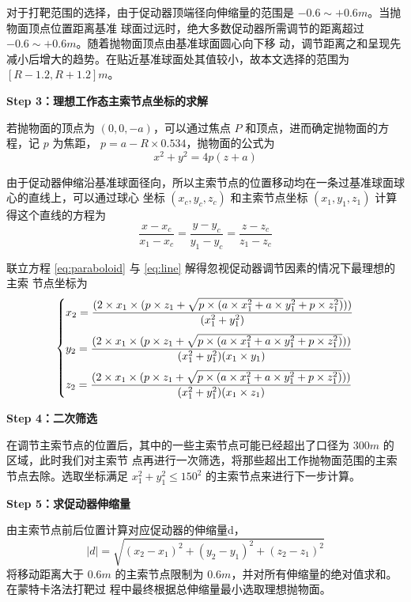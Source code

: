 \documentclass[withoutpreface,bwprint]{cumcmthesis} %
\begin{document}
对于打靶范围的选择，由于促动器顶端径向伸缩量的范围是 $-0.6\sim +0.6m$。当抛物面顶点位置距离基准
球面过远时，绝大多数促动器所需调节的距离超过 $-0.6\sim +0.6m$。随着抛物面顶点由基准球面圆心向下移
动，调节距离之和呈现先减小后增大的趋势。在贴近基准球面处其值较小，故本文选择的范围为$\left[R-1.2,
R+1.2\right]m$。

\textbf{Step 3：理想工作态主索节点坐标的求解}

若抛物面的顶点为 $(0,0,-a)$，可以通过焦点 $P$ 和顶点，进而确定抛物面的方程，记 $p$ 为焦距，
$p = a-R \times 0.534$，抛物面的公式为
\begin{equation}
    \label{eq:paraboloid}
    x^2 + y^2 = 4p(z + a)
\end{equation}

由于促动器伸缩沿基准球面径向，所以主索节点的位置移动均在一条过基准球面球心的直线上，可以通过球心
坐标 $(x_c,y_c,z_c)$ 和主索节点坐标 $(x_1,y_1,z_1)$ 计算得这个直线的方程为
\begin{equation}
    \label{eq:line}
    \frac{\displaystyle x - x_c}{\displaystyle x_1 - x_c} = \frac{\displaystyle y - y_c}
    {\displaystyle y_1 - y_c} = \frac{\displaystyle z - z_c}{\displaystyle z_1 - z_c}
\end{equation}

联立方程 \eqref{eq:paraboloid} 与 \eqref{eq:line} 解得忽视促动器调节因素的情况下最理想的主索
节点坐标为
\[
\begin{dcases}
    \smallskip
    x_2 = \frac{(2\times x_1\times (p\times z_1 + \sqrt{p\times (a\times x_1^2 + a\times
    y_1^2 + p\times z_1^2)}))}{(x_1^2 + y_1^2)}  \\
    \smallskip
    y_2 = \frac{(2\times x_1\times (p\times z_1 + \sqrt{p\times (a\times x_1^2 + a\times
    y_1^2 + p\times z_1^2)}))}{(x_1^2 + y_1^2)(x_1 \times y_1)}  \\
    z_2 = \frac{(2\times x_1\times (p\times z_1 + \sqrt{p\times (a\times x_1^2 + a\times
    y_1^2 + p\times z_1^2)}))}{(x_1^2 + y_1^2)(x_1 \times z_1)}  \\
\end{dcases}
\]

\textbf{Step 4：二次筛选}

在调节主索节点的位置后，其中的一些主索节点可能已经超出了口径为 $300m$ 的区域，此时我们对主索节
点再进行一次筛选，将那些超出工作抛物面范围的主索节点去除。选取坐标满足 $x_1^2 + y_1^2 \leqslant  150^2$
的主索节点来进行下一步计算。

\textbf{Step 5：求促动器伸缩量}

由主索节点前后位置计算对应促动器的伸缩量d，
\[
    |d| = \sqrt{(x_2-x_1)^2 + (y_2-y_1)^2 + (z_2-z_1)^2}
\]
将移动距离大于 $0.6m$ 的主索节点限制为 $0.6m$，并对所有伸缩量的绝对值求和。在蒙特卡洛法打靶过
程中最终根据总伸缩量最小选取理想抛物面。
\end{document}
